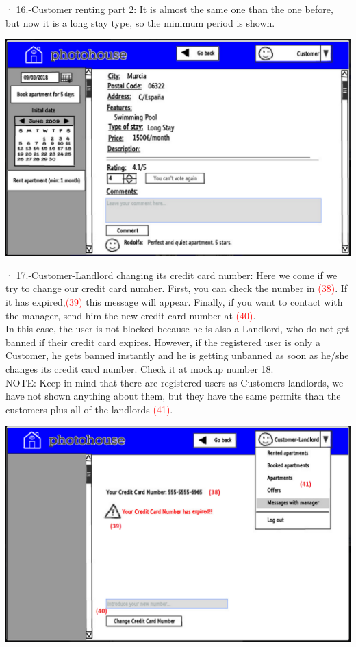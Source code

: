 \documentclass[12pt]{article}
\begin{document}
{\newpage
· \underline{16.-Customer renting part 2:} It is almost the same one than the one before, but now it is a long stay type, so the minimum period is shown.
\begin{center}
	\includegraphics[scale=.7]{customer_renting_long.PNG}
\end{center}


· \underline{17.-Customer-Landlord changing its credit card number:} Here we come if we try to change our credit card number. First, you can check the number in \textcolor{red}{(38)}. If it has expired,\textcolor{red}{(39)} this message will appear. Finally, if you want to contact with the manager, send him the new credit card number at \textcolor{red}{(40)}.\\In this case, the user is not blocked because he is also a Landlord, who do not get banned if their credit card expires. However, if the registered user is only a Customer, he gets banned instantly and he is getting unbanned as soon as he/she changes its credit card number. Check it at mockup number 18.\\
NOTE: Keep in mind that there are registered users as Customers-landlords, we have not shown anything about them, but they have the same permits than the customers plus all of the landlords \textcolor{red}{(41)}.
\begin{center}
	\includegraphics[scale=.7]{changing_ccn.PNG}
\end{center}


}
\end{document}
